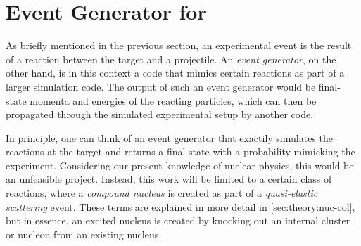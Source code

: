 

\section{Event Generator for \rtb{}}
As briefly mentioned in the previous section, an experimental event is the result of a reaction between the target and a projectile.
An \emph{event generator}, on the other hand, is in this context a code that mimics certain reactions as part of a larger simulation code. The output of such an event generator would be final-state momenta and energies of the reacting particles, which can then be propagated through the simulated experimental setup by another code. 

In principle, one can think of an event generator that exactily simulates the reactions at the target and returns a final state with a probability mimicking the experiment. Considering our present knowledge of nuclear physics, this would be an unfeasible project. Instead, this work will be limited to a certain class of reactions, where a \emph{compound nucleus} is created as part of a \emph{quasi-elastic scattering} event. These terms are explained in more detail in \autoref{sec:theory:nuc-col}, but in essence, an excited nucleus is created by knocking out an internal cluster or nucleon from an existing nucleus.



